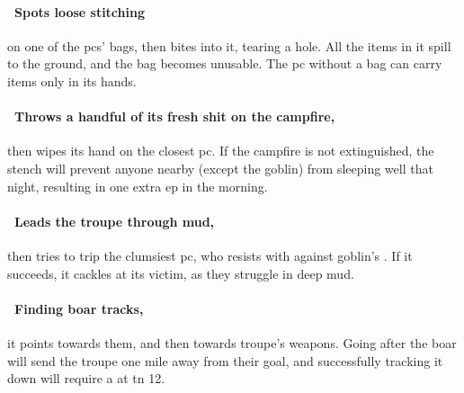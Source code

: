 \documentclass[10pt,twoside]{book}
\begin{document}
\paragraph{\Square~Spots loose stitching}
on one of the \glspl{pc}' bags, then bites into it, tearing a hole.
All the items in it spill to the ground, and the bag becomes unusable.
The \gls{pc} without a bag can carry items only in its hands.

\paragraph{\Square~Throws a handful of its fresh shit on the campfire,}
then wipes its hand on the closest \gls{pc}.
If the campfire is not extinguished, the stench will prevent anyone nearby (except the goblin) from sleeping well that night, resulting in one extra \gls{ep} in the morning.

\paragraph{\Square~Leads the troupe through mud,}
then tries to trip the clumsiest \gls{pc}, who resists with  against goblin's .
If it succeeds, it cackles at its victim, as they struggle in deep mud.


\boar

\paragraph{\Square~Finding boar tracks,}
it points towards them, and then towards troupe's \glspl{weapon}.
Going after the boar will send the troupe one mile away from their goal, and successfully tracking it down will require a  at \gls{tn} 12.
\end{document}
